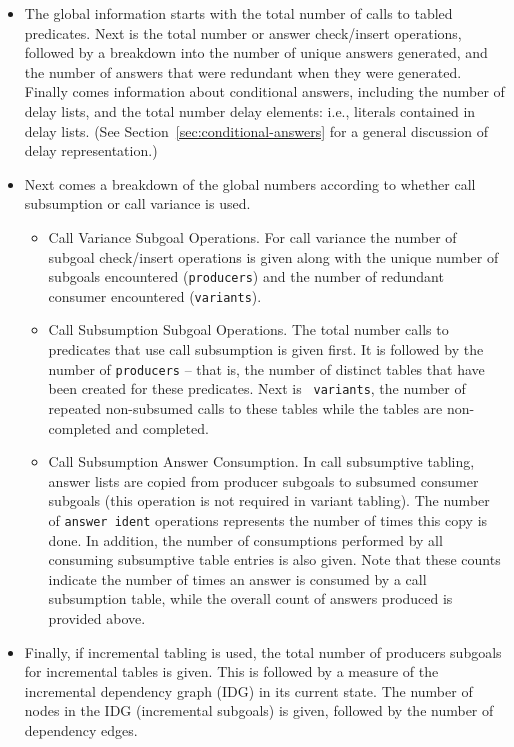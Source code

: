 \begin{description}
\begin{itemize}
\begin{itemize}
\item The global information starts with the total number of calls to
 tabled predicates.  Next is the total number or answer check/insert
 operations, followed by a breakdown into the number of unique answers
 generated, and the number of answers that were redundant when they
 were generated.  Finally comes information about conditional answers,
 including the number of delay lists, and the total number delay
 elements: i.e., literals contained in delay lists.  (See
 Section~\ref{sec:conditional-answers} for a general discussion of
 delay representation.)

\item Next comes a breakdown of the global numbers according to
 whether call subsumption or call variance is used. 
\begin{itemize}
\item Call Variance Subgoal Operations.  For call variance the number
of subgoal check/insert operations is given along with the unique
number of subgoals encountered ({\tt producers}) and the number of
redundant consumer encountered ({\tt variants}).
%
\item Call Subsumption Subgoal Operations.  The total number calls to
 predicates that use call subsumption is given first.  It is followed
 by the number of {\tt producers} -- that is, the number of distinct
 tables that have been created for these predicates.  Next is {\tt
 variants}, the number of repeated non-subsumed calls to these tables
 while the tables are non-completed and completed.
%
\item Call Subsumption Answer Consumption.  In call subsumptive
 tabling, answer lists are copied from producer subgoals to subsumed
 consumer subgoals (this operation is not required in variant
 tabling).  The number of {\tt answer ident} operations represents the
 number of times this copy is done.  In addition, the number of
 consumptions performed by all consuming subsumptive table entries is
 also given.  Note that these counts indicate the number of times an
 answer is consumed by a call subsumption table, while the overall
 count of answers produced is provided above.
%
\end{itemize}
\item Finally, if incremental tabling is used, the total number of
 producers subgoals for incremental tables is given.  This is followed
 by a measure of the incremental dependency graph (IDG) in its current
 state.  The number of nodes in the IDG (incremental subgoals) is
 given, followed by the number of dependency edges.
\end{itemize}


\end{itemize}
\end{description}
